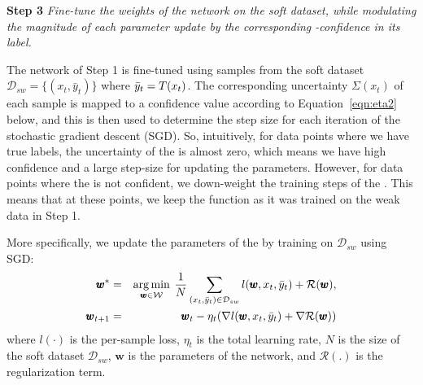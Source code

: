 
%
\textbf{Step 3} \emph{Fine-tune the weights of the \std network on the soft dataset, while modulating the magnitude of each parameter update by the corresponding \tch-confidence in its label.}

The \std network of Step 1 is fine-tuned using samples from the soft dataset $\mathcal{D}_{sw}=\{(x_t, \bar{y}_t)\}$ where $\bar{y}_t=T(x_t)$.
The corresponding uncertainty $\Sigma(x_t)$ of each sample is mapped to a confidence value according to Equation~\ref{eqn:eta2} below, and this is then used to determine the step size for each iteration of the stochastic gradient descent (SGD). So, intuitively, for data points where we have true labels, the uncertainty of the \tch is almost zero, which means we have high confidence and a large step-size for updating the parameters. However, for data points where the \tch is not confident, we down-weight the training steps of the \std. This means that at these points, we keep the \std function as it was trained on the weak data in Step 1.

More specifically, we update the parameters of the \std by training on $\mathcal{D}_{sw}$ using SGD:
\begin{eqnarray*}
  \pmb{w}^* &=& \operatorname*{arg\,min}_{\pmb{w} \in \mathcal{W}} \> \frac{1}{N}\sum_{(x_t,\bar{y}_t) \in \mathcal{D}_{sw}}l(\pmb{w}, x_t, \bar{y}_t) + \mathcal{R}(\pmb{w}), \\
  \pmb{w}_{t+1} &=& \pmb{w}_t - \eta_t(\nabla l(\pmb{w},x_t,\bar{y}_t) + \nabla \mathcal{R}(\pmb{w}))
\end{eqnarray*}
where $l(\cdot)$ is the per-sample loss, $\eta_t$ is the total learning rate, $N$ is the size of the soft dataset $\mathcal{D}_{sw}$, $\pmb{w}$ is the parameters of the \std network, and $\mathcal{R(.)}$ is the regularization term. %

